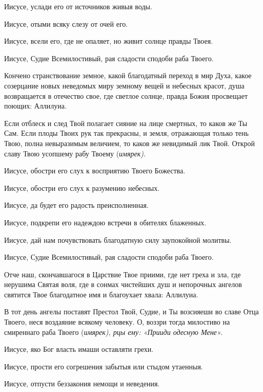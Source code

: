 Иисусе, услади его от источников живыя воды. 

Иисусе, отыми всяку слезу от очей его. 

Иисусе, всели его, где не опаляет, но живит солнце правды Твоея. 

Иисусе, Судие Всемилостивый, рая сладости сподоби раба Твоего.




Кончено странствование земное, какой благодатный переход в мир Духа, какое созерцание новых неведомых миру земному вещей и небесных красот, душа возвращается в отечество свое, где светлое солнце, правда Божия просвещает поющих: Аллилуиа.




Если отблеск и след Твой полагает сияние на лице смертных, то каков же Ты Сам. Если плоды Твоих рук так прекрасны, и земля, отражающая только тень Твою, полна невыразимым величием, то каков же невидимый лик Твой. Открой славу Твою усопшему рабу Твоему (\itshape имярек\normalfont{}). 

Иисусе, обостри его слух к восприятию Твоего Божества. 

Иисусе, обостри его слух к разумению небесных. 

Иисусе, да будет его радость преисполненная. 

Иисусе, подкрепи его надеждою встречи в обителях блаженных. 

Иисусе, дай нам почувствовать благодатную силу заупокойной молитвы. 

Иисусе, Судие Всемилостивый, рая сладости сподоби раба Твоего.




Отче наш, скончавшагося в Царствие Твое приими, где нет греха и зла, где нерушима Святая воля, где в сонмах чистейших душ и непорочных ангелов святится Твое благодатное имя и благоухает хвала: Аллилуиа.




В тот день ангелы поставят Престол Твой, Судие, и Ты возсияеши во славе Отца Твоего, неся воздаяние всякому человеку. О, воззри тогда милостиво на смиреннаго раба Твоего (\itshape имярек\normalfont{}), рцы ему: «Прииди одесную Мене». 

Иисусе, яко Бог власть имаши оставляти грехи. 

Иисусе, прости его согрешения забытыя или стыдом утаенныя. 

Иисусе, отпусти беззакония немощи и неведения. 

